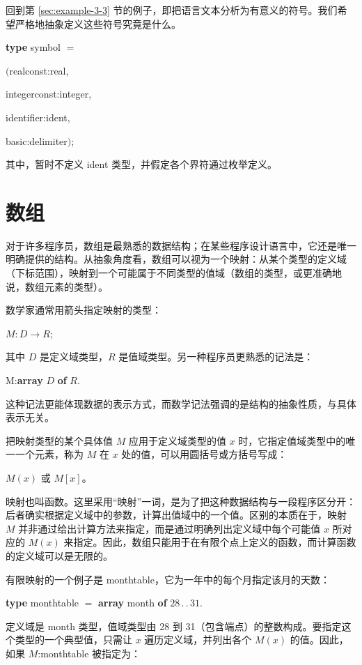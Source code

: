 回到第 \ref{sec:example-3-3} 节的例子，即把语言文本分析为有意义的符号。我们希望严格地抽象定义这些符号究竟是什么。

\quad \textbf{type} symbol $=$

\tabto*{5.6em}$($realconst:real,

\tabto*{6em}integerconst:integer,

\tabto*{6em}identifier:ident,

\tabto*{6em}basic:delimiter$)$;

\noindent
其中，暂时不定义 ident 类型，并假定各个界符通过枚举定义。
\section[数组]{数组}
\label{sec:array}

对于许多程序员，数组是最熟悉的数据结构；在某些程序设计语言中，它还是唯一明确提供的结构。从抽象角度看，数组可以视为一个映射：从某个类型的定义域（下标范围），映射到一个可能属于不同类型的值域（数组的类型，或更准确地说，数组元素的类型）。

数学家通常用箭头指定映射的类型：

\quad $M:D\rightarrow R$;

\noindent
其中 $D$ 是定义域类型，$R$ 是值域类型。另一种程序员更熟悉的记法是：

\quad M:\textbf{array} $D$ \textbf{of} $R$.

\noindent
这种记法更能体现数据的表示方式，而数学记法强调的是结构的抽象性质，与具体表示无关。

把映射类型的某个具体值 $M$ 应用于定义域类型的值 $x$ 时，它指定值域类型中的唯一一个元素，称为 $M$ 在 $x$ 处的值，可以用圆括号或方括号写成：

\quad $M(x)$ 或 $M[x]$。

\noindent
映射也叫函数。这里采用“映射”一词，是为了把这种数据结构与一段程序区分开：后者确实根据定义域中的参数，计算出值域中的一个值。区别的本质在于，映射 $M$ 并非通过给出计算方法来指定，而是通过明确列出定义域中每个可能值 $x$ 所对应的 $M(x)$ 来指定。因此，数组只能用于在有限个点上定义的函数，而计算函数的定义域可以是无限的。

有限映射的一个例子是 monthtable，它为一年中的每个月指定该月的天数：

\quad \textbf{type} monthtable $=$ \textbf{array} month \textbf{of} $28\,.\,.\,31$.

\noindent
定义域是 month 类型，值域类型由 28 到 31（包含端点）的整数构成。要指定这个类型的一个典型值，只需让 $x$ 遍历定义域，并列出各个 $M(x)$ 的值。因此，如果 $M$:monthtable 被指定为：

